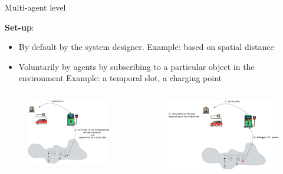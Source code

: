 \begin{frame}{Multi-agent level}
\par \textbf{Set-up}:
\begin{itemize}
    \item By default by the system designer. Example: based on spatial distance
    \item Voluntarily by agents by subscribing to a particular object in the environment Example: a temporal slot, a charging point
\end{itemize}
\vspace{.3cm}
\begin{columns}
\begin{column}{.45\linewidth}
\begin{figure}
	\includegraphics[width=\textwidth]{figures/example1.png}
\end{figure}
\end{column}
\begin{column}{.55\linewidth}
\begin{figure}
	\includegraphics[width=\textwidth]{figures/example2.png}
\end{figure}
\end{column}
\end{columns}


\end{frame}
